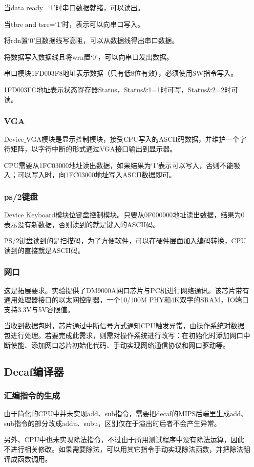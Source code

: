 当data$\_$ready=‘1’时串口数据就绪，可以读出。

当tbre and tsre=‘1’时，表示可以向串口写入。

将rdn置‘0’且数据线写高阻，可以从数据线得出串口数据。

将数据写入数据线且将wrn置‘0’，可以向串口发出数据。

串口模块1FD003F8地址表示数据（只有低8位有效），必须使用SW指令写入。

1FD003FC地址表示状态寄存器Status，Status$\&$1=1时可写，Status$\&$2=2时可读。
\subsubsection{VGA}
Device$\_$VGA模块是显示控制模块，接受CPU写入的ASCII码数据，并维护一个字符矩阵，以字符中断的形式通过VGA接口输出到显示器。

CPU需要从1FC03000地址读出数据，如果结果为‘1’表示可以写入，否则不能吸入；可以写入时，向1FC03000地址写入ASCII数据即可。
\subsubsection{ps/2键盘}
Device$\_$Keyboard模块位键盘控制模块。只要从0F000000地址读出数据，结果为0表示没有新数据，否则读到的就是键入的ASCII码。

PS/2键盘读到的是扫描码，为了方便软件，可以在硬件层面加入编码转换，CPU读到的直接就是ASCII码。
\subsubsection{网口}
这是拓展要求。实验提供了DM9000A网口芯片与PC机进行网络通讯。该芯片带有通用处理器接口的以太网控制器，一个10/100M PHY和4K双字的SRAM，IO端口支持3.3V与5V容限值。

当收到数据包时，芯片通过中断信号方式通知CPU触发异常，由操作系统对数据包进行处理。若要完成此需求，则需对操作系统进行改写：在初始化时添加网口中断使能、添加网口芯片初始化代码、手动实现网络通信协议和网口驱动等。
\subsection{Decaf编译器}
\subsubsection{汇编指令的生成}
由于简化的CPU中并未实现add、sub指令，需要把decaf的MIPS后端里生成add、sub指令的部分改成addu、subu，区别仅在于溢出时后者不会产生异常。

另外、CPU中也未实现除法指令，不过由于所用测试程序中没有除法运算，因此不进行相关修改。如果需要除法，可以用其它指令手动实现除法函数，并把除法翻译成函数调用。
